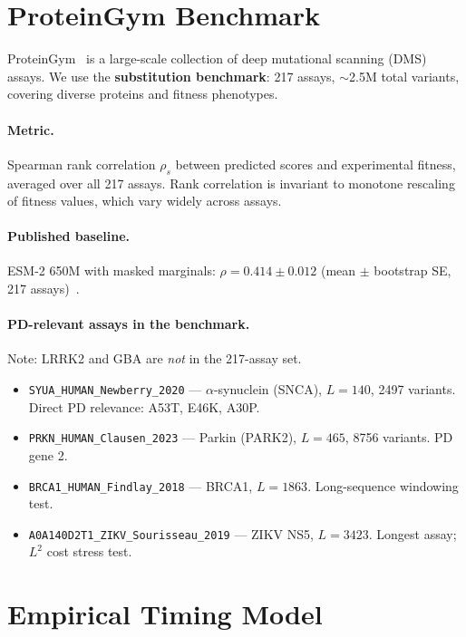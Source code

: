 \documentclass[11pt,a4paper]{article}
\begin{document}
\section{ProteinGym Benchmark}

ProteinGym~\cite{notin2023proteingym} is a large-scale collection of
deep mutational scanning (DMS) assays.
We use the \textbf{substitution benchmark}: 217 assays, $\sim$2.5M total
variants, covering diverse proteins and fitness phenotypes.

\paragraph{Metric.}
Spearman rank correlation $\rho_s$ between predicted scores and
experimental fitness, averaged over all 217 assays.
Rank correlation is invariant to monotone rescaling of fitness values,
which vary widely across assays.

\paragraph{Published baseline.}
ESM-2 650M with masked marginals: $\rho = 0.414 \pm 0.012$
(mean $\pm$ bootstrap SE, 217 assays)~\cite{notin2023proteingym}.

\paragraph{PD-relevant assays in the benchmark.}
Note: LRRK2 and GBA are \emph{not} in the 217-assay set.

\begin{itemize}[nosep]
  \item \texttt{SYUA\_HUMAN\_Newberry\_2020} — $\alpha$-synuclein (SNCA),
        $L{=}140$, 2497 variants. Direct PD relevance: A53T, E46K, A30P.
  \item \texttt{PRKN\_HUMAN\_Clausen\_2023} — Parkin (PARK2),
        $L{=}465$, 8756 variants. PD gene 2.
  \item \texttt{BRCA1\_HUMAN\_Findlay\_2018} — BRCA1, $L{=}1863$.
        Long-sequence windowing test.
  \item \texttt{A0A140D2T1\_ZIKV\_Sourisseau\_2019} — ZIKV NS5, $L{=}3423$.
        Longest assay; $L^2$ cost stress test.
\end{itemize}

\section{Empirical Timing Model}
\end{document}
